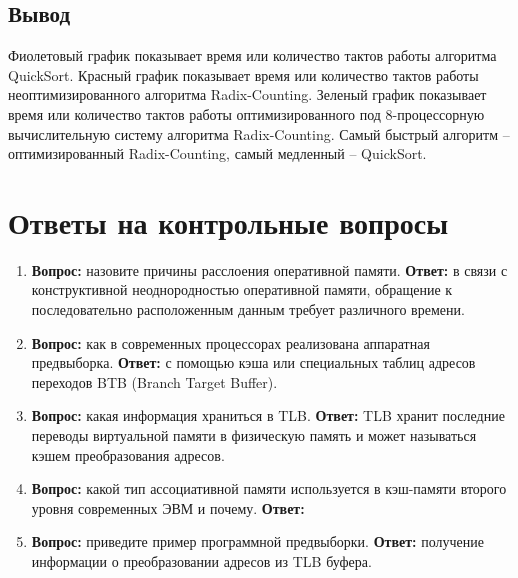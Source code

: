 \documentclass{article}
\begin{document}
\subsection{Вывод}
Фиолетовый график показывает время или количество тактов работы алгоритма QuickSort. Красный график показывает время 
или количество тактов работы неоптимизированного алгоритма Radix-Counting. Зеленый график показывает время или 
количество тактов работы оптимизированного под 8-процессорную вычислительную систему алгоритма Radix-Counting. 
Самый быстрый алгоритм -- оптимизированный Radix-Counting, самый медленный -- QuickSort.

\clearpage\section{Ответы на контрольные вопросы}
\begin{enumerate}
	\item \textbf{Вопрос:} назовите причины расслоения оперативной памяти. \textbf{Ответ:} в связи с конструктивной 
неоднородностью оперативной памяти, обращение к последовательно расположенным данным требует различного времени.
	\item \textbf{Вопрос:} как в современных процессорах реализована аппаратная предвыборка. \textbf{Ответ:} с помощью 
кэша или  специальных таблиц адресов переходов BTB (Branch Target Buffer).
	\item \textbf{Вопрос:} какая информация храниться в TLB. \textbf{Ответ:} TLB хранит последние переводы виртуальной 
памяти в физическую память и может называться кэшем преобразования адресов.
	\item \textbf{Вопрос:} какой тип ассоциативной памяти используется в кэш-памяти второго уровня современных ЭВМ и 
почему. \textbf{Ответ:} 
	\item \textbf{Вопрос:} приведите пример программной предвыборки. \textbf{Ответ:} получение информации о 
преобразовании адресов из TLB буфера. 
\end{enumerate}
\end{document}
